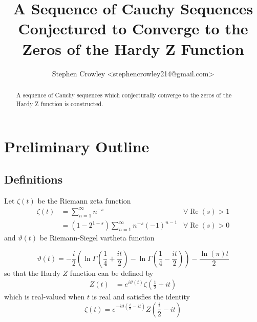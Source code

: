 \documentclass{elsarticle}
\newcommand{\tmop}[1]{\ensuremath{\operatorname{#1}}}
\begin{document}
\title{A Sequence of Cauchy Sequences Conjectured to Converge to the Zeros of the Hardy Z Function}

\author{
  Stephen Crowley <stephencrowley214@gmail.com>
}

\begin{abstract}
  A sequence of Cauchy sequences which conjecturally converge to the
  zeros of the Hardy Z function is constructed.
\end{abstract}
\maketitle

\section{Preliminary Outline}

\subsection{Definitions}

Let $\zeta (t)$ be the Riemann zeta function
\begin{equation}
  \begin{array}{lll}
    \zeta (t) & = \sum_{n = 1}^{\infty} n^{- s} & \forall \tmop{Re} (s) > 1\\
    & = (1 - 2^{1 - s}) \sum_{n = 1}^{\infty} n^{- s} (- 1)^{n - 1} & \forall
    \tmop{Re} (s) > 0
  \end{array}
\end{equation}
and $\vartheta (t)$ be Riemann-Siegel vartheta function


\begin{equation}
  \vartheta (t) = - \frac{i}{2} \left( \ln \Gamma \left( \frac{1}{4} + \frac{i
  t}{2} \right) - \ln \Gamma \left( \frac{1}{4} - \frac{i t}{2} \right)
  \right) - \frac{\ln (\pi) t}{2} \label{vartheta}
\end{equation}
so that the Hardy $Z$ function{\cite{HardyZ}} can be defined by
\begin{equation}
  \begin{array}{ll}
    Z (t) & = e^{i \vartheta (t)} \zeta \left( \frac{1}{2} + i t \right)
  \end{array} \label{Z}
\end{equation}
which is real-valued when $t$ is real and satisfies the identity
\begin{equation}
  \zeta (t) = e^{- i \vartheta \left( \frac{i}{2} - i t \right)} Z \left(
  \frac{i}{2} - i t \right) \label{Zz}
\end{equation}
\end{document}
